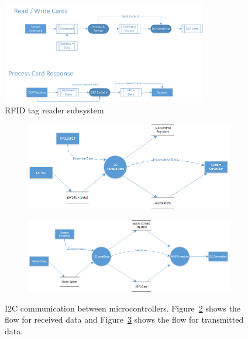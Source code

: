 \documentclass[12pt]{article} %
\begin{document}
\begin{figure}[H]
	\centering
	\includegraphics[width=0.8\textwidth]{images/RFIDreaderDataFlow.png}
	\caption{RFID tag reader subsystem}
	\label{fig:rfidDataFlow}
\end{figure}

\begin{figure}[H]
	\centering
	\begin{subfigure}{\textwidth}
	\includegraphics[width=\textwidth]{images/I2CReceiveDataCtrlFlow.png}
	\caption{}
	\label{fig:i2cReceiveFlow}
	\end{subfigure}

	\begin{subfigure}{\textwidth}
		\includegraphics[width=\textwidth]{images/I2CSendCtrlFlow.png}
		\caption{}
		\label{fig:i2cSendFlow}
	\end{subfigure}
	\caption{I2C communication between microcontrollers. Figure~\ref{fig:i2cReceiveFlow} shows the flow for received data and Figure~\ref{fig:i2cSendFlow} shows the flow for transmitted data.}
	\label{fig:i2cCtrlFlow}
\end{figure}
\end{document}
